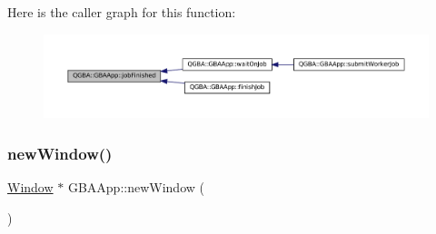 Here is the caller graph for this function\+:
\nopagebreak
\begin{figure}[H]
\begin{center}
\leavevmode
\includegraphics[width=350pt]{class_q_g_b_a_1_1_g_b_a_app_a7a50fa6391d527db7c25316c77dc165f_icgraph}
\end{center}
\end{figure}
\mbox{\label{class_q_g_b_a_1_1_g_b_a_app_aa1eef91286be508318f3416141f427a7}} 
\subsubsection{\texorpdfstring{new\+Window()}{newWindow()}}
{\footnotesize\ttfamily \mbox{\hyperlink{class_q_g_b_a_1_1_window}{Window}} $\ast$ G\+B\+A\+App\+::new\+Window (\begin{DoxyParamCaption}{ }\end{DoxyParamCaption})}

